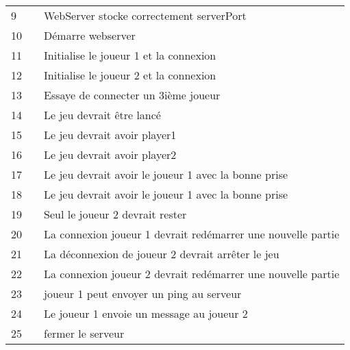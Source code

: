 \begin{center}
\begin{tabular}{|l|l|l|}
        9  &                                           & WebServer stocke correctement serverPort                          \\
        10 &                                           & Démarre webserver                                                 \\
        11 &                                           & Initialise le joueur 1 et la connexion                            \\
        12 &                                           & Initialise le joueur 2 et la connexion                            \\
        13 &                                           & Essaye de connecter un 3ième joueur                               \\
        14 &                                           & Le jeu devrait être lancé                                         \\
        15 &                                           & Le jeu devrait avoir player1                                      \\
        16 &                                           & Le jeu devrait avoir player2                                      \\
        17 &                                           & Le jeu devrait avoir le joueur 1 avec la bonne prise              \\
        18 &                                           & Le jeu devrait avoir le joueur 1 avec la bonne prise              \\
        19 &                                           & Seul le joueur 2 devrait rester                                   \\
        20 &                                           & La connexion joueur 1 devrait redémarrer une nouvelle partie      \\
        21 &                                           & La déconnexion de joueur 2 devrait arrêter le jeu                 \\
        22 &                                           & La connexion joueur 2 devrait redémarrer une nouvelle partie      \\
        23 &                                           & joueur 1 peut envoyer un ping au serveur                          \\
        24 &                                           & Le joueur 1 envoie un message au joueur 2                         \\
        25 &                                           & fermer le serveur                                                 \\




\end{tabular}
\end{center}

